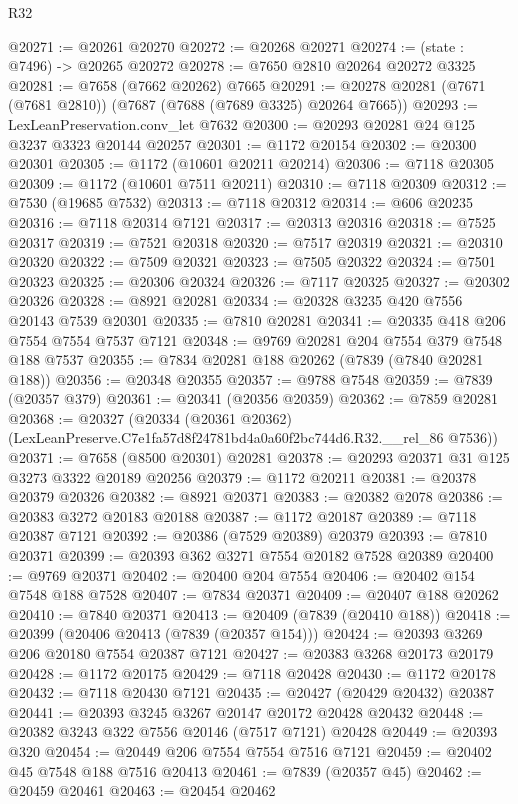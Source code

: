 \begin{lexlean}{R32}
\begin{coremodule}
@20271 := @20261 @20270
@20272 := @20268 @20271
@20274 := (state : @7496) -> @20265 @20272
@20278 := @7650 @2810 @20264 @20272 @3325
@20281 := @7658 (@7662 @20262) @7665
@20291 := @20278 @20281 (@7671 (@7681 @2810)) (@7687 (@7688 (@7689 @3325) @20264 @7665))
@20293 := LexLeanPreservation.conv_let @7632
@20300 := @20293 @20281 @24 @125 @3237 @3323 @20144 @20257
@20301 := @1172 @20154
@20302 := @20300 @20301
@20305 := @1172 (@10601 @20211 @20214)
@20306 := @7118 @20305
@20309 := @1172 (@10601 @7511 @20211)
@20310 := @7118 @20309
@20312 := @7530 (@19685 @7532)
@20313 := @7118 @20312
@20314 := @606 @20235
@20316 := @7118 @20314 @7121
@20317 := @20313 @20316
@20318 := @7525 @20317
@20319 := @7521 @20318
@20320 := @7517 @20319
@20321 := @20310 @20320
@20322 := @7509 @20321
@20323 := @7505 @20322
@20324 := @7501 @20323
@20325 := @20306 @20324
@20326 := @7117 @20325
@20327 := @20302 @20326
@20328 := @8921 @20281
@20334 := @20328 @3235 @420 @7556 @20143 @7539 @20301
@20335 := @7810 @20281
@20341 := @20335 @418 @206 @7554 @7554 @7537 @7121
@20348 := @9769 @20281 @204 @7554 @379 @7548 @188 @7537
@20355 := @7834 @20281 @188 @20262 (@7839 (@7840 @20281 @188))
@20356 := @20348 @20355
@20357 := @9788 @7548
@20359 := @7839 (@20357 @379)
@20361 := @20341 (@20356 @20359)
@20362 := @7859 @20281
@20368 := @20327
    (@20334 (@20361 @20362) (LexLeanPreserve.C7e1fa57d8f24781bd4a0a60f2bc744d6.R32.__rel_86 @7536))
@20371 := @7658 (@8500 @20301) @20281
@20378 := @20293 @20371 @31 @125 @3273 @3322 @20189 @20256
@20379 := @1172 @20211
@20381 := @20378 @20379 @20326
@20382 := @8921 @20371
@20383 := @20382 @2078
@20386 := @20383 @3272 @20183 @20188
@20387 := @1172 @20187
@20389 := @7118 @20387 @7121
@20392 := @20386 (@7529 @20389) @20379
@20393 := @7810 @20371
@20399 := @20393 @362 @3271 @7554 @20182 @7528 @20389
@20400 := @9769 @20371
@20402 := @20400 @204 @7554
@20406 := @20402 @154 @7548 @188 @7528
@20407 := @7834 @20371
@20409 := @20407 @188 @20262
@20410 := @7840 @20371
@20413 := @20409 (@7839 (@20410 @188))
@20418 := @20399 (@20406 @20413 (@7839 (@20357 @154)))
@20424 := @20393 @3269 @206 @20180 @7554 @20387 @7121
@20427 := @20383 @3268 @20173 @20179
@20428 := @1172 @20175
@20429 := @7118 @20428
@20430 := @1172 @20178
@20432 := @7118 @20430 @7121
@20435 := @20427 (@20429 @20432) @20387
@20441 := @20393 @3245 @3267 @20147 @20172 @20428 @20432
@20448 := @20382 @3243 @322 @7556 @20146 (@7517 @7121) @20428
@20449 := @20393 @320
@20454 := @20449 @206 @7554 @7554 @7516 @7121
@20459 := @20402 @45 @7548 @188 @7516 @20413
@20461 := @7839 (@20357 @45)
@20462 := @20459 @20461
@20463 := @20454 @20462

\end{coremodule}
\end{lexlean}
